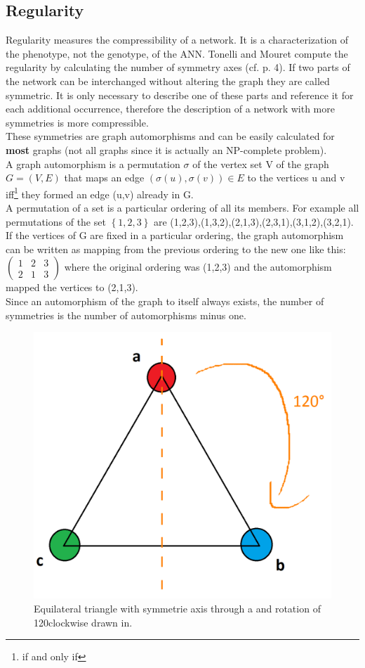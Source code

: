 \documentclass[12pt,twoside]{article}
\theoremstyle{plain}
\theoremstyle{definition}
\theoremstyle{remark}
\begin{document}
\subsection{Regularity}
\label{regularity}
Regularity measures the compressibility of a network. It is a characterization of the phenotype, not the genotype, of the ANN.
Tonelli and Mouret compute the regularity by calculating the number of symmetry axes (cf. \cite{citeulike:12788284} p. 4).
If two parts of the network can be interchanged without altering the graph they are called symmetric.
It is only necessary to describe one of these parts and reference it for each additional occurrence, therefore the description of a network with more symmetries is more compressible.\\
These symmetries are graph automorphisms and can be easily calculated for \textbf{most} graphs (not all graphs since it is actually an NP-complete problem).\\
A graph automorphism is a permutation $\sigma$ of the vertex set V of the graph $G = (V,E)$ that maps an edge $(\sigma(u),\sigma(v)) \in E$ to the vertices u and v iff\footnote{if and only if} they formed an edge (u,v) already in G.\\
A permutation of a set is a particular ordering of all its members. For example all permutations of the set $\left\{ 1,2,3 \right\}$ are (1,2,3),(1,3,2),(2,1,3),(2,3,1),(3,1,2),(3,2,1). If the vertices of G are fixed in a particular ordering, the graph automorphism can be written as mapping from the previous ordering to the new one like this: 
$
\begin{pmatrix}
1 & 2 & 3 \\
2 & 1 & 3
\end{pmatrix}
$ where the original ordering was (1,2,3) and the automorphism mapped the vertices to (2,1,3).\\
Since an automorphism of the graph to itself always exists, the number of symmetries is the number of automorphisms minus one.\medskip

\begin{figure}[!bth]
	\begin{center}
		\includegraphics[width=.43\textwidth]{GleichseitigUndGeschmeidig.png}
	\end{center}
	\caption{Equilateral triangle with symmetrie axis through a and rotation of 120\degree clockwise drawn in.}
	\label{fig:dreieck}
\end{figure}
\end{document}
